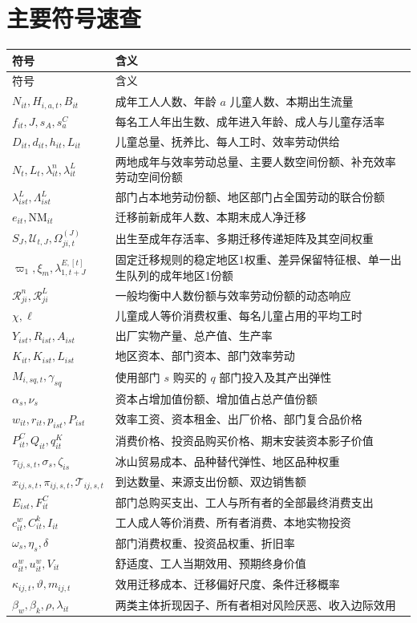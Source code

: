 \documentclass[UTF8,a4paper,zihao=-4,fontset=windows]{ctexart}
\numberwithin{equation}{section}
\newcommand{\pc}{P^{C}}
\newcommand{\invp}{Q}
\begin{document}
\section{主要符号速查}
{\small
\begin{longtable}{p{}p{}}
\toprule 符号 & 含义\\\midrule\endfirsthead
\toprule 符号 & 含义\\\midrule\endhead
\bottomrule\endfoot
$N_{it},H_{i,a,t},B_{it}$ & 成年工人人数、年龄 $a$ 儿童人数、本期出生流量\\
$f_{it},J,s_A,s^C_a$ & 每名工人年出生数、成年进入年龄、成人与儿童存活率\\
$D_{it},d_{it},h_{it},L_{it}$ & 儿童总量、抚养比、每人工时、效率劳动供给\\
$N_t,L_t,\lambda^n_{it},\lambda^L_{it}$ & 两地成年与效率劳动总量、主要人数空间份额、补充效率劳动空间份额\\
$\lambda^L_{ist},\Lambda^L_{ist}$ & 部门占本地劳动份额、地区部门占全国劳动的联合份额\\
$e_{it},\mathrm{NM}_{it}$ & 迁移前新成年人数、本期末成人净迁移\\
$S_J,\mathcal U_{t,J},\Omega_{ji,t}^{(J)}$ & 出生至成年存活率、多期迁移传递矩阵及其空间权重\\
$\varpi_1,\xi_m,\lambda^{E,[t]}_{1,t+J}$ & 固定迁移规则的稳定地区1权重、差异保留特征根、单一出生队列的成年地区1份额\\
$\mathcal R^n_{ji},\mathcal R^L_{ji}$ & 一般均衡中人数份额与效率劳动份额的动态响应\\
$\chi,\ell$ & 儿童成人等价消费权重、每名儿童占用的平均工时\\
$Y_{ist},R_{ist},A_{ist}$ & 出厂实物产量、总产值、生产率\\
$K_{it},K_{ist},L_{ist}$ & 地区资本、部门资本、部门效率劳动\\
$M_{i,sq,t},\gamma_{sq}$ & 使用部门 $s$ 购买的 $q$ 部门投入及其产出弹性\\
$\alpha_s,\nu_s$ & 资本占增加值份额、增加值占总产值份额\\
$w_{it},r_{it},p_{ist},P_{ist}$ & 效率工资、资本租金、出厂价格、部门复合品价格\\
$\pc_{it},\invp_{it},q^K_{it}$ & 消费价格、投资品购买价格、期末安装资本影子价值\\
$\tau_{ij,s,t},\sigma_s,\zeta_{is}$ & 冰山贸易成本、品种替代弹性、地区品种权重\\
$x_{ij,s,t},\pi_{ij,s,t},\mathcal T_{ij,s,t}$ & 到达数量、来源支出份额、双边销售额\\
$E_{ist},F^C_{it}$ & 部门总购买支出、工人与所有者的全部最终消费支出\\
$c^w_{it},C^k_{it},I_{it}$ & 工人成人等价消费、所有者消费、本地实物投资\\
$\omega_s,\eta_s,\delta$ & 部门消费权重、投资品权重、折旧率\\
$a^w_{it},u^w_{it},V_{it}$ & 舒适度、工人当期效用、预期终身价值\\
$\kappa_{ij,t},\vartheta,m_{ij,t}$ & 效用迁移成本、迁移偏好尺度、条件迁移概率\\
$\beta_w,\beta_k,\rho,\lambda_{it}$ & 两类主体折现因子、所有者相对风险厌恶、收入边际效用\\
\end{longtable}}

\clearpage
{}
{}


\end{document}
